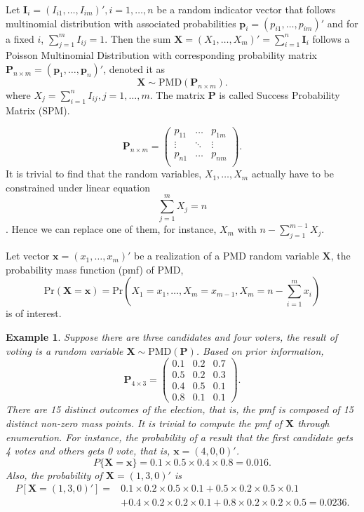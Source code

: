 \documentclass[12pt]{article}
\newcommand{\Ivec}{{\boldsymbol{I}}}
\newcommand{\Xmat}{\mathbf{X}}
\newcommand{\Pmat}{\mathbf{P}}
\newcommand{\pvec}{\boldsymbol{p}}
\newcommand{\PMD}{\textrm{PMD}}
\newcommand{\Xvec}{\boldsymbol{X}}
\newcommand{\xvec}{\boldsymbol{x}}
\newcommand{\qedw}{\hfill \ensuremath{\Box}}
\newtheorem{example}{Example}
\begin{document}
Let $\Ivec_{i} = (I_{i1}, \dots, I_{im})', i=1, \dots, n$ be a random indicator vector that follows multinomial distribution with associated probabilities $\pvec_{i} = (p_{i1}, \dots, p_{im})'$ and for a fixed $i$, $\sum_{j=1}^{m} I_{ij}=1$. Then the sum $\Xvec = (X_{1}, \dots, X_{m})'= \sum_{i=1}^{n}\Ivec_{i}$ follows a Poisson Multinomial Distribution with corresponding probability matrix $\Pmat_{n \times m} = (\pvec_{1}, \dots, \pvec_{n})'$, denoted it as
$$\Xvec \sim \PMD(\Pmat_{n\times m}).$$ where $X_{j} = \sum_{i=1}^{n} I_{ij}, j=1,\dots,m$. The matrix $\Pmat$ is called Success Probability Matrix (SPM).

\begin{equation*}
\Pmat_{n \times m} = \begin{pmatrix}
p_{11} &  \dots & p_{1m} \\
\vdots & \ddots & \vdots \\
p_{n1} &  \dots & p_{nm} \\
\end{pmatrix}.
\end{equation*}
It is trivial to find that the random variables, $X_1, \dots, X_{m}$ actually have to be constrained under linear equation $$\sum_{j=1}^{m}X_{j} = n$$. Hence we can replace one of them, for instance, $X_m$ with $n-\sum_{j=1}^{m-1}X_j$.

Let vector $\xvec = (x_1,\dots,x_m)'$ be a realization of a $\PMD$ random variable $\Xmat$, the probability mass function (pmf) of PMD,
$$\text{Pr}(\Xmat=\xvec) = \text{Pr} \left( X_1 = x_1, \dots, X_m = x_{m-1}, X_{m} = n-\sum_{i=1}^{m}x_i \right)$$
is of interest.

\begin{example}%
Suppose there are three candidates and four voters, the result of voting is a random variable $\Xmat \sim \PMD(\Pmat)$. Based on prior information,
\begin{equation*}
\Pmat_{4 \times 3} = \begin{pmatrix}
0.1 &  0.2 & 0.7\\
0.5 & 0.2 & 0.3\\
0.4 &  0.5 & 0.1\\
0.8 & 0.1 & 0.1
\end{pmatrix}.
\end{equation*}
There are 15 distinct outcomes of the election, that is, the pmf is composed of 15 distinct non-zero mass points. It is trivial to compute the pmf of $\Xmat$ through enumeration. For instance, the probability of a result that the first candidate gets 4 votes and others gets 0 vote, that is, $\xvec =  (4,0,0)'$.
\begin{equation*}
P\{\Xmat = \xvec \} = 0.1\times 0.5 \times 0.4 \times 0.8 = 0.016.
\end{equation*}
Also, the probability of $\Xmat=(1,3,0)'$ is
\begin{align*}
P[\Xmat = (1,3,0)']  =  & 0.1\times 0.2 \times 0.5 \times 0.1 +
 0.5\times0.2\times0.5 \times 0.1 \\
 & + 0.4\times0.2\times0.2\times0.1 + 0.8\times0.2\times0.2\times0.5 = 0.0236.
\end{align*}
\end{example}
\end{document}

